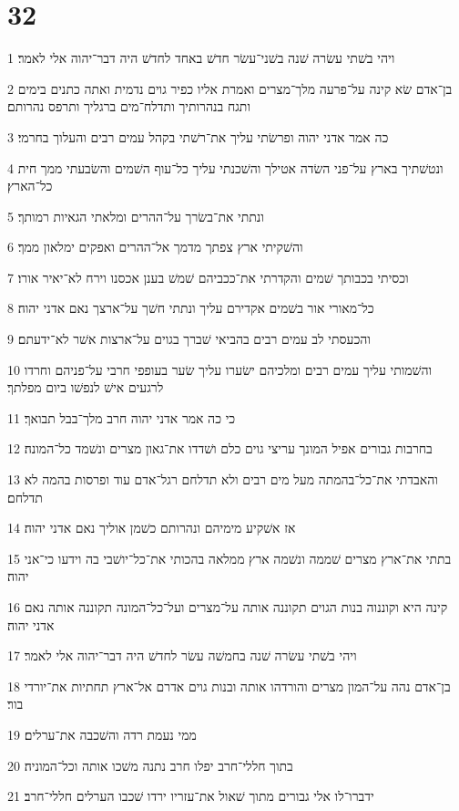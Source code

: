 \chapter{32}

\par 1 ויהי בשׁתי עשׂרה שׁנה בשׁני־עשׂר חדשׁ באחד לחדשׁ היה דבר־יהוה אלי לאמר׃
\par 2 בן־אדם שׂא קינה על־פרעה מלך־מצרים ואמרת אליו כפיר גוים נדמית ואתה כתנים בימים ותגח בנהרותיך ותדלח־מים ברגליך ותרפס נהרותם׃
\par 3 כה אמר אדני יהוה ופרשׂתי עליך את־רשׁתי בקהל עמים רבים והעלוך בחרמי׃
\par 4 ונטשׁתיך בארץ על־פני השׂדה אטילך והשׁכנתי עליך כל־עוף השׁמים והשׂבעתי ממך חית כל־הארץ׃
\par 5 ונתתי את־בשׂרך על־ההרים ומלאתי הגאיות רמותך׃
\par 6 והשׁקיתי ארץ צפתך מדמך אל־ההרים ואפקים ימלאון ממך׃
\par 7 וכסיתי בכבותך שׁמים והקדרתי את־ככביהם שׁמשׁ בענן אכסנו וירח לא־יאיר אורו׃
\par 8 כל־מאורי אור בשׁמים אקדירם עליך ונתתי חשׁך על־ארצך נאם אדני יהוה׃
\par 9 והכעסתי לב עמים רבים בהביאי שׁברך בגוים על־ארצות אשׁר לא־ידעתם׃
\par 10 והשׁמותי עליך עמים רבים ומלכיהם ישׂערו עליך שׂער בעופפי חרבי על־פניהם וחרדו לרגעים אישׁ לנפשׁו ביום מפלתך׃
\par 11 כי כה אמר אדני יהוה חרב מלך־בבל תבואך׃
\par 12 בחרבות גבורים אפיל המונך עריצי גוים כלם ושׁדדו את־גאון מצרים ונשׁמד כל־המונה׃
\par 13 והאבדתי את־כל־בהמתה מעל מים רבים ולא תדלחם רגל־אדם עוד ופרסות בהמה לא תדלחם׃
\par 14 אז אשׁקיע מימיהם ונהרותם כשׁמן אוליך נאם אדני יהוה׃
\par 15 בתתי את־ארץ מצרים שׁממה ונשׁמה ארץ ממלאה בהכותי את־כל־יושׁבי בה וידעו כי־אני יהוה׃
\par 16 קינה היא וקוננוה בנות הגוים תקוננה אותה על־מצרים ועל־כל־המונה תקוננה אותה נאם אדני יהוה׃
\par 17 ויהי בשׁתי עשׂרה שׁנה בחמשׁה עשׂר לחדשׁ היה דבר־יהוה אלי לאמר׃
\par 18 בן־אדם נהה על־המון מצרים והורדהו אותה ובנות גוים אדרם אל־ארץ תחתיות את־יורדי בור׃
\par 19 ממי נעמת רדה והשׁכבה את־ערלים׃
\par 20 בתוך חללי־חרב יפלו חרב נתנה משׁכו אותה וכל־המוניה׃
\par 21 ידברו־לו אלי גבורים מתוך שׁאול את־עזריו ירדו שׁכבו הערלים חללי־חרב׃
